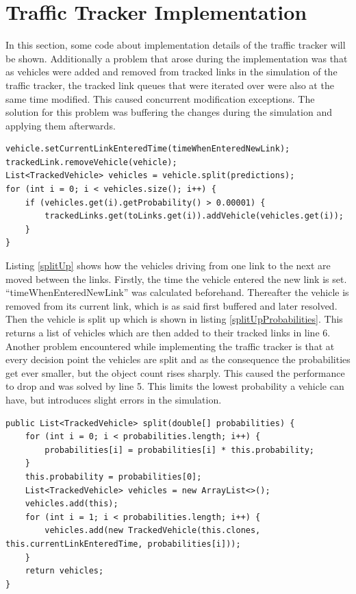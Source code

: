 \section{Traffic Tracker Implementation}

In this section, some code about implementation details of the traffic tracker will be shown. Additionally a problem that arose during the implementation was that as vehicles were added and removed from tracked links in the simulation of the traffic tracker, the tracked link queues that were iterated over were also at the same time modified. This caused concurrent modification exceptions. The solution for this problem was buffering the changes during the simulation and applying them afterwards.

\vspace{0.5em}

\begin{lstlisting}[caption={Split Up Vehicle to Multiple Links}, label=splitUp]
vehicle.setCurrentLinkEnteredTime(timeWhenEnteredNewLink);
trackedLink.removeVehicle(vehicle);
List<TrackedVehicle> vehicles = vehicle.split(predictions);
for (int i = 0; i < vehicles.size(); i++) {
	if (vehicles.get(i).getProbability() > 0.00001) {
		trackedLinks.get(toLinks.get(i)).addVehicle(vehicles.get(i));
	}
}
\end{lstlisting}

Listing \ref{splitUp} shows how the vehicles driving from one link to the next are moved between the links. Firstly, the time the vehicle entered the new link is set. ``timeWhenEnteredNewLink'' was calculated beforehand. Thereafter the vehicle is removed from its current link, which is as said first buffered and later resolved. Then the vehicle is split up which is shown in listing \ref{splitUpProbabilities}. This returns a list of vehicles which are then added to their tracked links in line 6. Another problem encountered while implementing the traffic tracker is that at every decision point the vehicles are split and as the consequence the probabilities get ever smaller, but the object count rises sharply. This caused the performance to drop and was solved by line 5. This limits the lowest probability a vehicle can have, but introduces slight errors in the simulation.

\vspace{0.5em}

\begin{lstlisting}[caption={Split Up Vehicle Probabilities}, label=splitUpProbabilities]
public List<TrackedVehicle> split(double[] probabilities) {
	for (int i = 0; i < probabilities.length; i++) {
		probabilities[i] = probabilities[i] * this.probability;
	}
	this.probability = probabilities[0];
	List<TrackedVehicle> vehicles = new ArrayList<>();
	vehicles.add(this);
	for (int i = 1; i < probabilities.length; i++) {
		vehicles.add(new TrackedVehicle(this.clones, this.currentLinkEnteredTime, probabilities[i]));
	}
	return vehicles;
}
\end{lstlisting}

